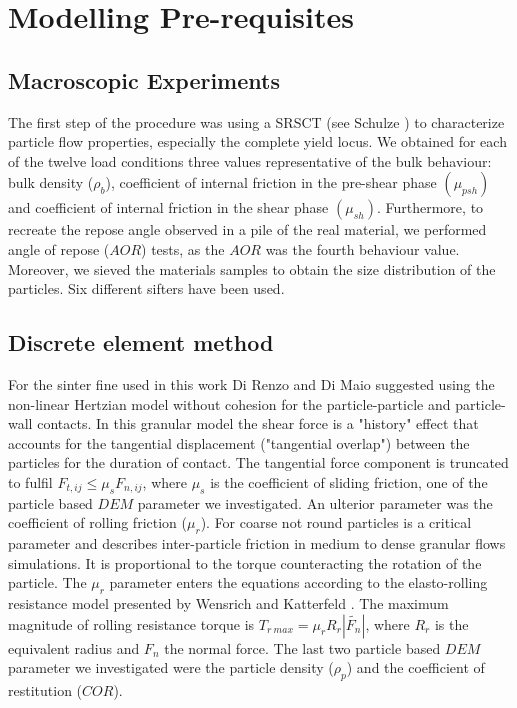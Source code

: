 \section{Modelling Pre-requisites}
\label{sec:modellingprerequisites}

\subsection{Macroscopic Experiments}
\label{subsec:Macroscopicexperiments}

The first step of the procedure was using a SRSCT (see Schulze
\cite{RefWorks:142}) to characterize particle flow properties, especially the complete yield locus.
We obtained for each of the twelve load conditions three values representative of the bulk behaviour: bulk density ($\rho_b$),
coefficient of internal friction in the pre-shear phase $ (\mu_{psh})$ and
coefficient of internal friction in the shear phase  $ (\mu_{sh})$.
Furthermore, to recreate the repose angle observed in a pile of the real material, 
we performed angle of repose ($AOR$) tests, as the $AOR$ was the fourth
behaviour value.
Moreover, we sieved the materials samples to obtain the size distribution of the
particles. Six different sifters have been used.

\subsection{Discrete element method}
\label{subsec:dem}
For the sinter fine used in this work 
Di Renzo and Di Maio \cite{RefWorks:145} suggested using the non-linear Hertzian model without cohesion for 
the particle-particle and particle-wall contacts. 
In this granular model the shear force is a "history" effect that accounts for the tangential displacement 
("tangential overlap") between the particles for the duration of contact. 
The tangential force component is truncated to fulfil $F_{t,ij} \leq \mu_s
F_{n,ij}$,
where $\mu_s$ is the coefficient of sliding friction, one of the particle based
$DEM$ parameter we investigated. 
An ulterior parameter was the coefficient of rolling friction ($\mu_r$). 
For coarse not round particles is a critical parameter and describes inter-particle 
friction in medium to dense granular flows simulations. It is proportional to the 
torque counteracting the rotation of the particle. The $\mu_r$ parameter enters the 
equations according to the elasto-rolling resistance model presented by Wensrich and 
Katterfeld \cite{RefWorks:87}. 
The maximum magnitude of rolling resistance torque is $T_{r~max} = \mu_r R_r
|\tilde{F_n}|$, where $R_r$ is the equivalent radius and $F_n$ the normal force.
The last two particle based $DEM$ parameter we investigated were the particle density 
($\rho_p$) and the coefficient of restitution ($COR$).

